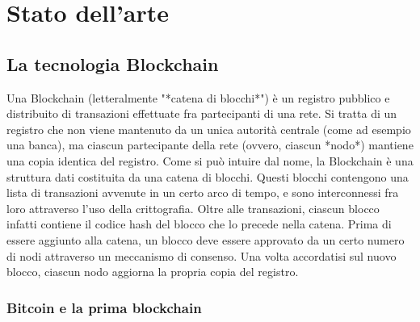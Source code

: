 \chapter{Stato dell'arte}
\lhead[\fancyplain{}{\bfseries\thepage}]{\fancyplain{}{\bfseries\rightmark}}
\section{La tecnologia Blockchain}

Una Blockchain (letteralmente "*catena di blocchi*") è un registro pubblico e distribuito di transazioni effettuate fra partecipanti di una rete. Si tratta di un registro che non viene mantenuto da un unica autorità centrale (come ad esempio una banca), ma ciascun partecipante della rete (ovvero, ciascun *nodo*) mantiene una copia identica del registro. Come si può intuire dal nome, la Blockchain è una struttura dati costituita da una catena di blocchi. Questi blocchi contengono una lista di transazioni avvenute in un certo arco di tempo, e sono interconnessi fra loro attraverso l'uso della crittografia. Oltre alle transazioni, ciascun blocco infatti contiene il codice hash del blocco che lo precede nella catena. Prima di essere aggiunto alla catena, un blocco deve essere approvato da un certo numero di nodi attraverso un meccanismo di consenso. Una volta accordatisi sul nuovo blocco, ciascun nodo aggiorna la propria copia del registro.

\subsection{Bitcoin e la prima blockchain}


